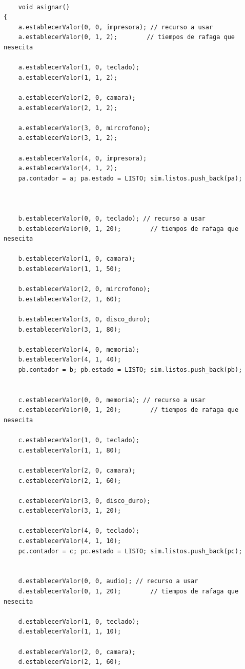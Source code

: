 \documentclass[12pt,a4paper]{article}
\begin{document}
\begin{lstlisting}
    
    void asignar()
{
    a.establecerValor(0, 0, impresora); // recurso a usar 
    a.establecerValor(0, 1, 2);        // tiempos de rafaga que nesecita

    a.establecerValor(1, 0, teclado);
    a.establecerValor(1, 1, 2);

    a.establecerValor(2, 0, camara);
    a.establecerValor(2, 1, 2);

    a.establecerValor(3, 0, mircrofono);
    a.establecerValor(3, 1, 2);

    a.establecerValor(4, 0, impresora);
    a.establecerValor(4, 1, 2);
    pa.contador = a; pa.estado = LISTO; sim.listos.push_back(pa);

    

    b.establecerValor(0, 0, teclado); // recurso a usar 
    b.establecerValor(0, 1, 20);        // tiempos de rafaga que nesecita

    b.establecerValor(1, 0, camara);
    b.establecerValor(1, 1, 50);

    b.establecerValor(2, 0, mircrofono);
    b.establecerValor(2, 1, 60);

    b.establecerValor(3, 0, disco_duro);
    b.establecerValor(3, 1, 80);

    b.establecerValor(4, 0, memoria);
    b.establecerValor(4, 1, 40);
    pb.contador = b; pb.estado = LISTO; sim.listos.push_back(pb);

    
    c.establecerValor(0, 0, memoria); // recurso a usar 
    c.establecerValor(0, 1, 20);        // tiempos de rafaga que nesecita

    c.establecerValor(1, 0, teclado);
    c.establecerValor(1, 1, 80);

    c.establecerValor(2, 0, camara);
    c.establecerValor(2, 1, 60);

    c.establecerValor(3, 0, disco_duro);
    c.establecerValor(3, 1, 20);

    c.establecerValor(4, 0, teclado);
    c.establecerValor(4, 1, 10);
    pc.contador = c; pc.estado = LISTO; sim.listos.push_back(pc);

    
    d.establecerValor(0, 0, audio); // recurso a usar 
    d.establecerValor(0, 1, 20);        // tiempos de rafaga que nesecita

    d.establecerValor(1, 0, teclado);
    d.establecerValor(1, 1, 10);

    d.establecerValor(2, 0, camara);
    d.establecerValor(2, 1, 60);


\end{lstlisting}
\end{document}
